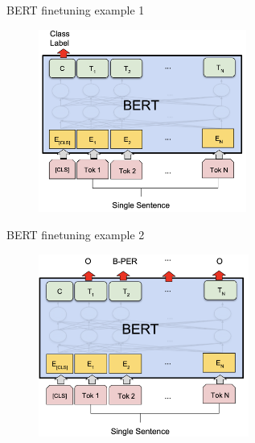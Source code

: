 \begin{frame}{BERT finetuning example 1}

\vfill
	
	\begin{figure}
		\centering
		\includegraphics[height = 6cm]{figure/bertfinetune1} 
	\end{figure}

\vfill

\end{frame}
\begin{frame}{BERT finetuning example 2}

\vfill
	
	\begin{figure}
		\centering
		\includegraphics[height = 6cm]{figure/bertfinetune2} 
	\end{figure}

\vfill

\end{frame}


